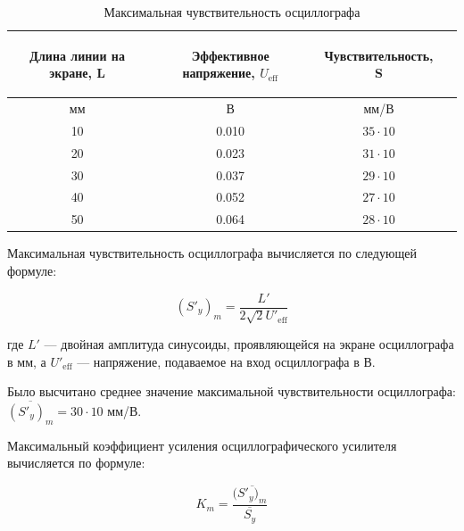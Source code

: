 \begin{center}
\begin{table}[H]
\centering
\caption{Максимальная чувствительность осциллографа}
\label{tabl:3}
\renewcommand{\arraystretch}{1.15}
\begin{tabular}{|c|c|c|c|}
\hline
\begin{minipage}{5cm}
\begin{center}
    Длина линии на экране, L
\end{center}
\end{minipage} &
\begin{minipage}{5cm}
\begin{center}
    Эффективное напряжение, $U_{\text{eff}}$
\end{center}
\end{minipage} &
\begin{minipage}{5cm}
\begin{center}
    Чувствительность, S
\end{center}
\end{minipage}\\
\hline
мм&В&мм/В\\
\hline
10  &  0.010  &  $35\cdot10$ \\
20  &  0.023  &  $31\cdot10$ \\
30  &  0.037  &  $29\cdot10$ \\
40  &  0.052  &  $27\cdot10$ \\
50  &  0.064  &  $28\cdot10$ \\
\hline
\end{tabular}
\end{table}
\end{center}

Максимальная чувствительность осциллографа вычисляется по следующей формуле:

\begin{equation}
\label{eq:6}
   (S'_y)_m=\frac{L'}{2\sqrt{2}U'_\text{{eff}}}
\end{equation}

где $L'$ — двойная амплитуда синусоиды, проявляющейся на экране осциллографа в мм, а $U'_\text{{eff}}$ — напряжение, подаваемое на вход осциллографа в В.

Было высчитано среднее значение максимальной чувствительности осциллографа: $\overline{(S'_y)_m} = 30\cdot10$ мм/В.

Максимальный коэффициент усиления осциллографического усилителя вычисляется по формуле:

\begin{equation}
\label{eq:7}
   K_m=\frac{(\overline{S'_y)_m}}{\overline{S_y}}
\end{equation}

